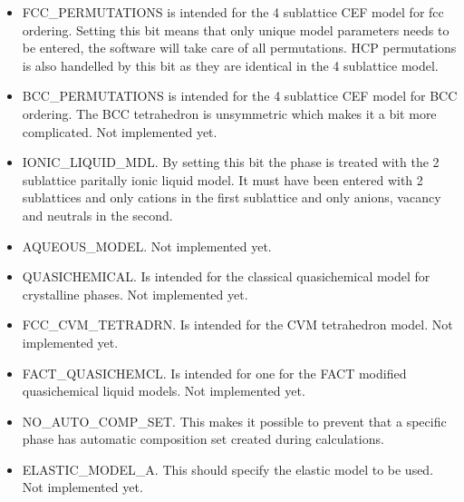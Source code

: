 \documentclass[12pt]{article}
\begin{document}
\begin{itemize}
\item FCC\_PERMUTATIONS is intended for the 4 sublattice CEF model for
fcc ordering.  Setting this bit means that only unique model
parameters needs to be entered, the software will take care of all
permutations.  HCP permutations is also handelled by this bit as they
are identical in the 4 sublattice model.

\item BCC\_PERMUTATIONS is intended for the 4 sublattice CEF model for
BCC ordering.  The BCC tetrahedron is unsymmetric which makes it a bit
more complicated.  Not implemented yet.

\item IONIC\_LIQUID\_MDL.  By setting this bit the phase is treated
with the 2 sublattice paritally ionic liquid model.  It must have been
entered with 2 sublattices and only cations in the first sublattice
and only anions, vacancy and neutrals in the second.

\item AQUEOUS\_MODEL. Not implemented yet.

\item QUASICHEMICAL. Is intended for the classical quasichemical
model for crystalline phases.  Not implemented yet.

\item FCC\_CVM\_TETRADRN.  Is intended for the CVM tetrahedron model.
Not implemented yet.

\item FACT\_QUASICHEMCL.  Is intended for one for the FACT modified
quasichemical liquid models.  Not implemented yet.

\item NO\_AUTO\_COMP\_SET.  This makes it possible to prevent that a
specific phase has automatic composition set created during
calculations.

\item ELASTIC\_MODEL\_A.  This should specify the elastic model to be
used.  Not implemented yet.
\end{itemize}
\end{document}
